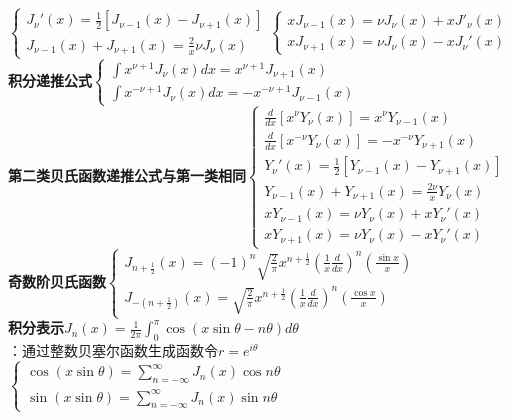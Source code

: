 \documentclass[10pt,a4paper]{article}
\begin{document}
\begin{multicols}{2}
\indent$\left\{\begin{array}{l}J_{\nu}'(x)=\frac{1}{2}[J_{\nu-1}(x)-J_{\nu+1}(x)]\\J_{\nu-1}(x)+J_{\nu+1}(x)=\frac{2}{x}\nu J_{\nu}(x)\end{array}\right.\left\{\begin{array}{l}xJ_{\nu-1}(x)=\nu J_{\nu}(x)+xJ'_{\nu}(x)\\xJ_{\nu+1}(x)=\nu J_{\nu}(x)-xJ_{\nu}'(x)\end{array}\right.$\\
\textbf{积分递推公式}$\left\{\begin{array}{l}\int x^{\nu+1}J_{\nu}(x)dx=x^{\nu+1}J_{\nu+1}(x)\\\int x^{-\nu+1}J_{\nu}(x)dx=-x^{-\nu+1}J_{\nu-1}(x)\end{array}\right.$\\
\textbf{第二类贝氏函数递推公式与第一类相同}$\left\{\begin{array}{l}\frac{d}{dx}[x^{\nu}Y_{\nu}(x)]=x^{\nu}Y_{\nu-1}(x)\\\frac{d}{dx}[x^{-\nu}Y_{\nu}(x)]=-x^{-\nu}Y_{\nu+1}(x)\\Y_{\nu}'(x)=\frac{1}{2}[Y_{\nu-1}(x)-Y_{\nu+1}(x)]\\Y_{\nu-1}(x)+Y_{\nu+1}(x)=\frac{2\nu}{x}Y_{\nu}(x)\\xY_{\nu-1}(x)=\nu Y_{\nu}(x)+xY_{\nu}'(x)\\xY_{\nu+1}(x)=\nu Y_{\nu}(x)-xY_{\nu}'(x)\end{array}\right.$\\
\indent\textbf{奇数阶贝氏函数}$\left\{\begin{array}{l}J_{n+\frac{1}{2}}(x)=(-1)^n\sqrt{\frac{2}{\pi}}x^{n+\frac{1}{2}}(\frac{1}{x}\frac{d}{dx})^n(\frac{\sin x}{x})\\J_{-(n+\frac{1}{2})}(x)=\sqrt{\frac{2}{\pi}}x^{n+\frac{1}{2}}(\frac{1}{x}\frac{d}{dx})^n(\frac{\cos x}{x})\end{array}\right.$\\
\textbf{积分表示}$J_n(x)=\frac{1}{2\pi}\int_0^{\pi}\cos(x\sin\theta-n\theta)d\theta$\\
\indent{}：通过整数贝塞尔函数生成函数令$r=e^{i\theta}$\\
$\left\{\begin{array}{l}\cos(x\sin\theta)=\sum_{n=-\infty}^{\infty}J_n(x)\cos n\theta\\\sin(x\sin\theta)=\sum_{n=-\infty}^{\infty}J_n(x)\sin n\theta\end{array}\right.$\\

\end{multicols}
\end{document}
